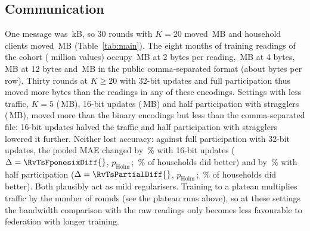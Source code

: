 \subsection{Communication}
One message was \PayloadKB{}\,kB, so 30 rounds with $K=20$ moved \EthreefedavgiidMB{}\,MB and household clients moved
\EonethreefedavghouseholdMB{}\,MB (Table~\ref{tab:main}). The eight months of training readings of the cohort
(\RvRawReadings{} million values) occupy \RvRawTwo{}\,MB at 2 bytes per reading, \RvRawFour{}\,MB at 4 bytes,
\RvRawTwelve{}\,MB at 12 bytes and \RvRawCsv{}\,MB in the public comma-separated format (about \RvCsvBytesPerRow{}
bytes per row). Thirty rounds at $K\ge20$ with 32-bit updates and full participation thus moved more bytes than the
readings in any of these encodings. Settings with less traffic, $K=5$ (\EonefourfedavgKfiveMB{}\,MB), 16-bit updates
(\EonetwofedavgfponesixmoderateMB{}\,MB) and half participation with stragglers (\EeightfedavgpartialMB{}\,MB), moved
more than the binary encodings but less than the comma-separated file: 16-bit updates halved the traffic and half participation with stragglers
lowered it further. Neither lost accuracy: against full participation with 32-bit updates, the pooled MAE changed by
\RvPrecfponesixRel{}\,\% with 16-bit updates ($\Delta=\RvTsFponesixDiff{}$, $p_{\mathrm{Holm}}$\,\RvTsFponesixP{}; \RvTsFponesixHH{}\,\% of households
did better) and by \RvPrecpartialRel{}\,\% with half participation ($\Delta=\RvTsPartialDiff{}$, $p_{\mathrm{Holm}}$\,\RvTsPartialP{};
\RvTsPartialHH{}\,\% of households did better). Both plausibly act as mild regularisers. Training to a plateau multiplies traffic by the number of rounds
(see the plateau runs above), so at these settings the bandwidth comparison with the raw readings only becomes less favourable to
federation with longer training.

